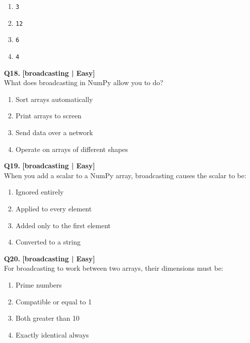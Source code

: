 \begin{enumerate}[label=(\alph*),topsep=2pt,itemsep=1pt,partopsep=0pt,parsep=0pt]
    \item \relax \texttt{3}
    \item \relax \texttt{12}
    \item \relax \texttt{6}
    \item \relax \texttt{4}
\end{enumerate}
\vspace{2mm}

\noindent\textbf{Q18.} \hfill {\small\color{LPUOrange}\textbf{[broadcasting | Easy]}}\\[2pt]
What does broadcasting in NumPy allow you to do?

\begin{enumerate}[label=(\alph*),topsep=2pt,itemsep=1pt,partopsep=0pt,parsep=0pt]
    \item \relax Sort arrays automatically
    \item \relax Print arrays to screen
    \item \relax Send data over a network
    \item \relax Operate on arrays of different shapes
\end{enumerate}
\vspace{2mm}

\noindent\textbf{Q19.} \hfill {\small\color{LPUOrange}\textbf{[broadcasting | Easy]}}\\[2pt]
When you add a scalar to a NumPy array, broadcasting causes the scalar to be:

\begin{enumerate}[label=(\alph*),topsep=2pt,itemsep=1pt,partopsep=0pt,parsep=0pt]
    \item \relax Ignored entirely
    \item \relax Applied to every element
    \item \relax Added only to the first element
    \item \relax Converted to a string
\end{enumerate}
\vspace{2mm}

\noindent\textbf{Q20.} \hfill {\small\color{LPUOrange}\textbf{[broadcasting | Easy]}}\\[2pt]
For broadcasting to work between two arrays, their dimensions must be:

\begin{enumerate}[label=(\alph*),topsep=2pt,itemsep=1pt,partopsep=0pt,parsep=0pt]
    \item \relax Prime numbers
    \item \relax Compatible or equal to 1
    \item \relax Both greater than 10
    \item \relax Exactly identical always
\end{enumerate}
\vspace{2mm}

